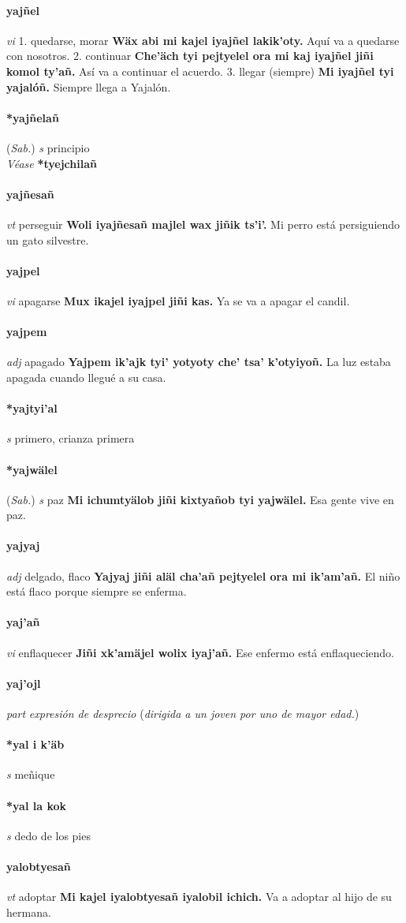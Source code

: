 \documentclass{scrbook}
\newcommand{\entry}[1]{\paragraph{#1}}
\newcommand{\onedefinition}[1]{#1.}
\newcommand{\nontranslationdef}[1]{\textit{#1}}
\newcommand{\partofspeech}[1]{\textit{#1}}
\newcommand{\spanishtranslation}[1]{#1}
\newcommand{\clarification}[1]{(\textit{#1})}
\newcommand{\cholexample}[1]{\textbf{#1}}
\newcommand{\exampletranslation}[1]{#1}
\newcommand{\alsosee}[1]{\\\textit{Véase} \textbf{#1}}
\newcommand{\relevantdialect}[1]{(\textit{#1})}
\begin{document}
\begin{multicols}{2}
\entry{yajñel}
\partofspeech{vi}
\onedefinition{1}
\spanishtranslation{quedarse, morar}
\cholexample{Wäx abi mi kajel iyajñel lakik'oty.}
\exampletranslation{Aquí va a quedarse con nosotros.}
\onedefinition{2}
\spanishtranslation{continuar}
\cholexample{Che'äch tyi pejtyelel ora mi kaj iyajñel jiñi komol ty'añ.}
\exampletranslation{Así va a continuar el acuerdo.}
\onedefinition{3}
\spanishtranslation{llegar (siempre)}
\cholexample{Mi iyajñel tyi yajalóñ.}
\exampletranslation{Siempre llega a Yajalón.}

\entry{*yajñelañ}
\relevantdialect{Sab.}
\partofspeech{s}
\spanishtranslation{principio}
\alsosee{*tyejchilañ}

\entry{yajñesañ}
\partofspeech{vt}
\spanishtranslation{perseguir}
\cholexample{Woli iyajñesañ majlel wax jiñik ts'i'.}
\exampletranslation{Mi perro está persiguiendo un gato silvestre.}

\entry{yajpel}
\partofspeech{vi}
\spanishtranslation{apagarse}
\cholexample{Mux ikajel iyajpel jiñi kas.}
\exampletranslation{Ya se va a apagar el candil.}

\entry{yajpem}
\partofspeech{adj}
\spanishtranslation{apagado}
\cholexample{Yajpem ik'ajk tyi' yotyoty che' tsa' k'otyiyoñ.}
\exampletranslation{La luz estaba apagada cuando llegué a su casa.}

\entry{*yajtyi'al}
\partofspeech{s}
\spanishtranslation{primero, crianza primera}

\entry{*yajwälel}
\relevantdialect{Sab.}
\partofspeech{s}
\spanishtranslation{paz}
\cholexample{Mi ichumtyälob jiñi kixtyañob tyi yajwälel.}
\exampletranslation{Esa gente vive en paz.}

\entry{yajyaj}
\partofspeech{adj}
\spanishtranslation{delgado, flaco}
\cholexample{Yajyaj jiñi aläl cha'añ pejtyelel ora mi ik'am'añ.}
\exampletranslation{El niño está flaco porque siempre se enferma.}

\entry{yaj'añ}
\partofspeech{vi}
\spanishtranslation{enflaquecer}
\cholexample{Jiñi xk'amäjel wolix iyaj'añ.}
\exampletranslation{Ese enfermo está enflaqueciendo.}

\entry{yaj'ojl}
\partofspeech{part}
\nontranslationdef{expresión de desprecio}
\clarification{dirigida a un joven por uno de mayor edad.}

\entry{*yal i k'äb}
\partofspeech{s}
\spanishtranslation{meñique}

\entry{*yal la kok}
\partofspeech{s}
\spanishtranslation{dedo de los pies}

\entry{yalobtyesañ}
\partofspeech{vt}
\spanishtranslation{adoptar}
\cholexample{Mi kajel iyalobtyesañ iyalobil ichich.}
\exampletranslation{Va a adoptar al hijo de su hermana.}


\end{multicols}
\end{document}
